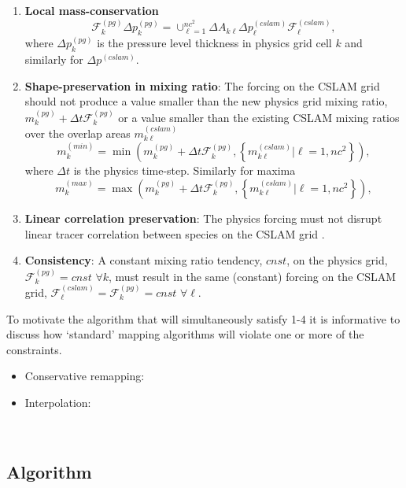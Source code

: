 \begin{enumerate}
\item {\bf{Local mass-conservation}}
\begin{equation}
\mathcal F_k^{(pg)}\Delta p^{(pg)}_k=\cup_{\ell=1}^{nc^2}\Delta A_{k\ell}\Delta p^{(cslam)}_\ell \mathcal F^{(cslam)}_\ell,
\end{equation}
where $\Delta p^{(pg)}_k$ is the pressure level thickness in physics grid cell $k$ and similarly for $\Delta p^{(cslam)}$.
\item {\bf{Shape-preservation in mixing ratio}}: The forcing on the CSLAM grid should not produce a value smaller than the new physics grid mixing ratio, $m^{(pg)}_k+\Delta t\mathcal F_k^{(pg)}$ or a value smaller than the existing CSLAM mixing ratios over the overlap areas $m^{(cslam)}_{k\ell}$
\begin{equation}
m_k^{(min)}=\min \left( m^{(pg)}_k+\Delta t \mathcal F_k^{(pg)},\left\{ m^{(cslam)}_{k\ell} |\ell=1,nc^2\right\} \right),
\end{equation}
where $\Delta t$ is the physics time-step. Similarly for maxima
\begin{equation}
m_k^{(max)}=\max \left( m^{(pg)}_k+\Delta t \mathcal F_k^{(pg)},\left\{ m^{(cslam)}_{k\ell} |\ell=1,nc^2\right\} \right),
\end{equation}
\item {\bf{Linear correlation preservation}}: The physics forcing must not disrupt linear tracer correlation between species on the CSLAM grid \citep[see, e.g., ][]{LT2011QJR}.
\item {\bf{Consistency}}: A constant mixing ratio tendency, $cnst$, on the physics grid, $\mathcal F_k^{(pg)}=cnst$ $\forall k$, must result in the same (constant) forcing on the CSLAM grid, $\mathcal F_\ell^{(cslam)}=\mathcal F_k^{(pg)}=cnst$ $\forall \ell$.
\end{enumerate}
To motivate the algorithm that will simultaneously satisfy 1-4 it is informative to discuss how `standard' mapping algorithms will violate one or more of the constraints.
\begin{itemize}
\item Conservative remapping: 
\item Interpolation:
\end{itemize}

{\color{red}{some text about how challenging it is to satisfy 1-3 simultaneously}}\\
\subsection{Algorithm}

